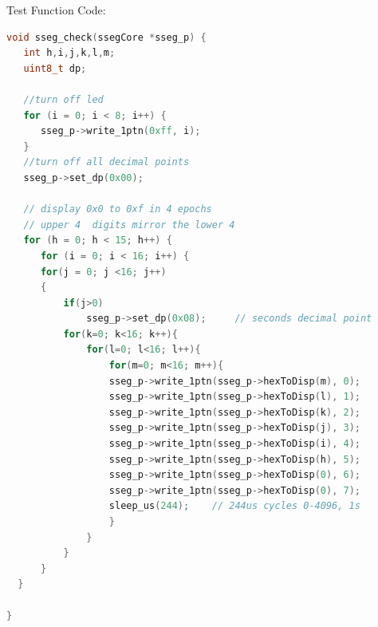 \documentclass{article}
\begin{document}
Test Function Code:
\begin{lstlisting}[language=C++]
void sseg_check(ssegCore *sseg_p) {
   int h,i,j,k,l,m;
   uint8_t dp;

   //turn off led
   for (i = 0; i < 8; i++) {
      sseg_p->write_1ptn(0xff, i);
   }
   //turn off all decimal points
   sseg_p->set_dp(0x00);

   // display 0x0 to 0xf in 4 epochs
   // upper 4  digits mirror the lower 4
   for (h = 0; h < 15; h++) {
      for (i = 0; i < 16; i++) {
	  for(j = 0; j <16; j++)
	  {
		  if(j>0)
			  sseg_p->set_dp(0x08);		// seconds decimal point
		  for(k=0; k<16; k++){
			  for(l=0; l<16; l++){
				  for(m=0; m<16; m++){
				  sseg_p->write_1ptn(sseg_p->hexToDisp(m), 0);
				  sseg_p->write_1ptn(sseg_p->hexToDisp(l), 1);
				  sseg_p->write_1ptn(sseg_p->hexToDisp(k), 2);
				  sseg_p->write_1ptn(sseg_p->hexToDisp(j), 3);
				  sseg_p->write_1ptn(sseg_p->hexToDisp(i), 4);
				  sseg_p->write_1ptn(sseg_p->hexToDisp(h), 5);
				  sseg_p->write_1ptn(sseg_p->hexToDisp(0), 6);
				  sseg_p->write_1ptn(sseg_p->hexToDisp(0), 7);
				  sleep_us(244);	// 244us cycles 0-4096, 1s
				  }
			  }
		  }
	  }
  }

}
\end{lstlisting}
\end{document}
